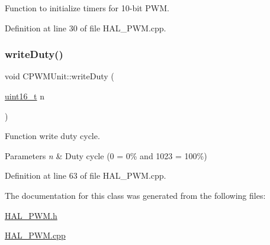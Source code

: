 Function to initialize timers for 10-\/bit P\+WM. 



Definition at line 30 of file H\+A\+L\+\_\+\+P\+W\+M.\+cpp.

\mbox{\label{class_c_p_w_m_unit_a60f8be5eabf779f57e6392a0432bf7f2}} 
\subsubsection{\texorpdfstring{write\+Duty()}{writeDuty()}}
{\footnotesize\ttfamily void C\+P\+W\+M\+Unit\+::write\+Duty (\begin{DoxyParamCaption}\item[{\mbox{\hyperlink{_a_d_a_s___types_8h_a1f1825b69244eb3ad2c7165ddc99c956}{uint16\+\_\+t}}}]{n }\end{DoxyParamCaption})}



Function write duty cycle. 


\begin{DoxyParams}{Parameters}
{\em n} & Duty cycle (0 = 0\% and 1023 = 100\%) \\
\hline
\end{DoxyParams}


Definition at line 63 of file H\+A\+L\+\_\+\+P\+W\+M.\+cpp.



The documentation for this class was generated from the following files\+:\begin{DoxyCompactItemize}
\item 
\mbox{\hyperlink{_h_a_l___p_w_m_8h}{H\+A\+L\+\_\+\+P\+W\+M.\+h}}\item 
\mbox{\hyperlink{_h_a_l___p_w_m_8cpp}{H\+A\+L\+\_\+\+P\+W\+M.\+cpp}}\end{DoxyCompactItemize}
